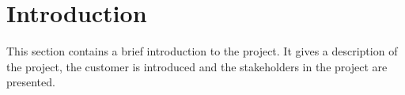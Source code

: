 \chapter{Introduction}

This section contains a brief introduction to the project. It gives a description of the project, the customer is introduced and the stakeholders in the project are presented.

